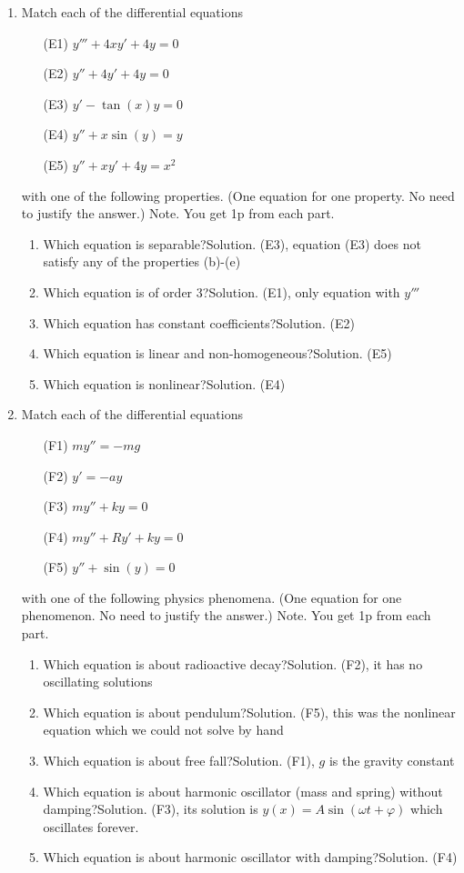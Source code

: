 \documentclass[12pt]{article}
\newcommand{\ratkaisu}[1]{{\color{blue}\quad\textrm{Solution. } #1}}
\newcommand{\huomautus}[1]{{\color{magenta}\quad\textrm{Note. } #1}}
\begin{document}
\begin{enumerate}
\item Match each of the differential equations
\begin{enumerate}[label=(\roman*)]
\item [(E1)] $y'''+4xy'+4y=0$ %
\item [(E2)] $y''+4y'+4y=0$ %
\item [(E3)] $y'-\tan(x)y=0$ %
\item [(E4)] $y''+x\sin(y)=y$ %
\item [(E5)] $y''+xy'+4y=x^2$ %
\end{enumerate}
with one of the following properties. (One equation for one property. No need to justify the answer.) \huomautus{You get 1p from each part.}
\begin{enumerate}
\item Which equation is separable?\ratkaisu{(E3), equation (E3) does not satisfy any of the properties (b)-(e)}
\item Which equation is of order 3?\ratkaisu{(E1), only equation with $y'''$}
\item Which equation has constant coefficients?\ratkaisu{(E2)}
\item Which equation is linear and non-homogeneous?\ratkaisu{(E5)}
\item Which equation is nonlinear?\ratkaisu{(E4)}
\end{enumerate}



\item Match each of the differential equations
\begin{enumerate}
\item [(F1)] $my''=-mg$ %
\item [(F2)] $y'=-ay$ %
\item [(F3)] $my''+ky=0$ %
\item [(F4)] $my''+Ry'+ky=0$ %
\item [(F5)]  $y''+\sin(y)=0$ %
\end{enumerate}
with one of the following physics phenomena. (One equation for one phenomenon. No need to justify the answer.) \huomautus{You get 1p from each part.}

\begin{enumerate}
\item Which equation is about radioactive decay?\ratkaisu{(F2), it has no oscillating solutions}
\item Which equation is about pendulum?\ratkaisu{(F5), this was the nonlinear equation which we could not solve by hand}
\item Which equation is about free fall?\ratkaisu{(F1), $g$ is the gravity constant}
\item Which equation is about harmonic oscillator (mass and spring) without damping?\ratkaisu{(F3), its solution is $y(x)=A\sin(\omega t+\varphi)$ which oscillates forever.}
\item Which equation is about harmonic oscillator with damping?\ratkaisu{(F4)}


\end{enumerate}
\end{enumerate}
\end{document}
